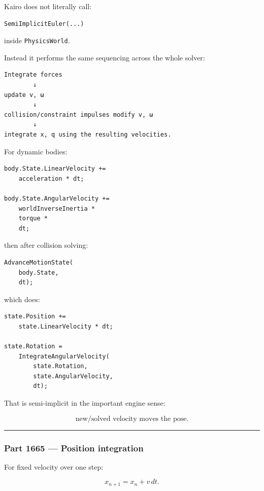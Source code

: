 Kairo does not literally call:

\begin{verbatim}
SemiImplicitEuler(...)
\end{verbatim}

inside \texttt{PhysicsWorld}.

Instead it performs the same sequencing across the whole solver:

\begin{verbatim}
Integrate forces
        ↓
update v, ω
        ↓
collision/constraint impulses modify v, ω
        ↓
integrate x, q using the resulting velocities.
\end{verbatim}

For dynamic bodies:

\begin{verbatim}
body.State.LinearVelocity +=
    acceleration * dt;

body.State.AngularVelocity +=
    worldInverseInertia *
    torque *
    dt;
\end{verbatim}

then after collision solving:

\begin{verbatim}
AdvanceMotionState(
    body.State,
    dt);
\end{verbatim}

which does:

\begin{verbatim}
state.Position +=
    state.LinearVelocity * dt;

state.Rotation =
    IntegrateAngularVelocity(
        state.Rotation,
        state.AngularVelocity,
        dt);
\end{verbatim}

That is semi-implicit in the important engine sense:

\[
\boxed{
\text{new/solved velocity moves the pose.}
}
\]

\begin{center}\rule{0.5\linewidth}{0.5pt}\end{center}

\subsubsection{Part 1665 --- Position integration}\label{part-1665-position-integration}

For fixed velocity over one step:

\[
\boxed{
x_{n+1}
=
x_n+v\,dt.
}
\]

